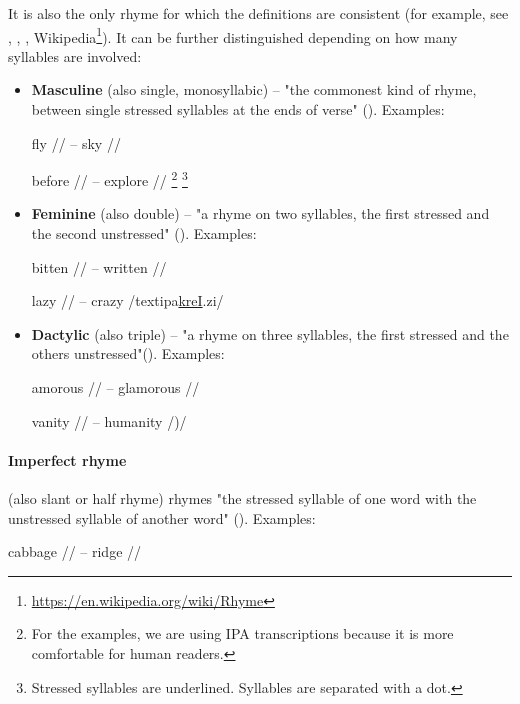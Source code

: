 It is also the only rhyme for which the definitions are consistent (for example, see \cite{bain1867manual}, \cite{vanphonological}, \cite{bergman2017litcharts}, Wikipedia\footnote{\url{https://en.wikipedia.org/wiki/Rhyme}}). It can be further distinguished depending on how many syllables are involved:

\begin{itemize}
	\item \textbf{Masculine} (also single, monosyllabic) -- "the commonest kind of rhyme, between single stressed syllables at the ends of verse" (\cite{oxforddict2008literary}). 
	Examples: 
	
	fly // -- sky //
	
	before // -- explore //
	\footnote{For the examples, we are using IPA transcriptions because it is more comfortable for human readers.}
	\footnote{Stressed syllables are underlined. Syllables are separated with a dot.}
	
	\item \textbf{Feminine} (also double) -- "a rhyme on two syllables, the first stressed and the second unstressed" (\cite{oxforddict2008literary}). Examples: 
	
	bitten // -- written //
	
	lazy // -- crazy /textipa{\underline{kreI}.zi}/
	
	\item \textbf{Dactylic} (also triple) -- "a rhyme on three syllables, the first stressed and the others unstressed"(\cite{oxforddict2008literary}). Examples: 
	
	amorous // -- glamorous //
	
	vanity // -- humanity /)/
	
\end{itemize}

\paragraph{Imperfect rhyme} (also slant or half rhyme)  rhymes "the stressed syllable of one word with the unstressed syllable of another word" (\cite{bergman2017litcharts}). Examples: 

cabbage // -- ridge //

